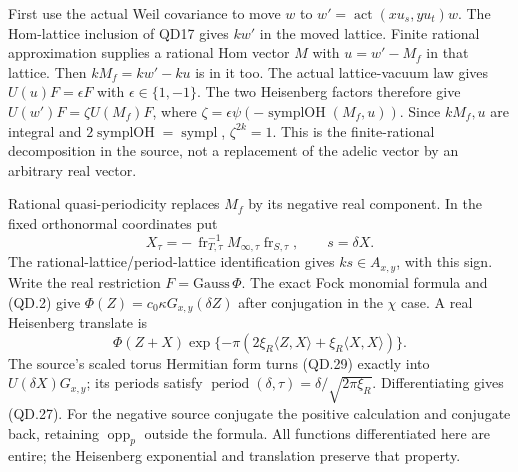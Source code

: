 First use the actual Weil covariance to move $w$ to
$w'=\operatorname{act}(xu_s,yu_t)w$.  The Hom-lattice inclusion
of QD17 gives $kw'$ in the moved lattice.  Finite rational
approximation supplies a rational Hom vector $M$ with
$u=w'-M_f$ in that lattice.  Then $kM_f=kw'-ku$ is in it too.
The actual lattice-vacuum law gives $U(u)F=\epsilon F$ with
$\epsilon\in\{1,-1\}$.  The two Heisenberg factors therefore
give
$U(w')F=\zeta U(M_f)F$, where
$\zeta=\epsilon\psi(-\operatorname{symplOH}(M_f,u))$.
Since $kM_f,u$ are integral and
$2\operatorname{symplOH}=\operatorname{sympl}$,
$\zeta^{2k}=1$.  This is the finite-rational decomposition in
the source, not a replacement of the adelic vector by an
arbitrary real vector.

Rational quasi-periodicity replaces $M_f$ by its negative real
component.  In the fixed orthonormal coordinates put
\[
 X_\tau=-\,\operatorname{fr}_{T,\tau}^{-1}M_{\infty,\tau}
                         \operatorname{fr}_{S,\tau},
                              \qquad s=\delta X.           \tag{QD.28}
\]
The rational-lattice/period-lattice identification gives
$ks\in A_{x,y}$, with this sign.  Write the real restriction
$F=\mathrm{Gauss}\,\Phi$.  The exact Fock monomial formula and
(QD.2) give $\Phi(Z)=c_0\kappa G_{x,y}(\delta Z)$ after
conjugation in the $\chi$ case.  A real Heisenberg translate
is
\[
 \Phi(Z+X)\exp\{-\pi(2\xi_R\langle Z,X\rangle
                                      +\xi_R\langle X,X\rangle)\}.
                                                               \tag{QD.29}
\]
The source's scaled torus Hermitian form turns (QD.29) exactly
into $U(\delta X)G_{x,y}$; its periods satisfy
$\operatorname{period}(\delta,\tau)
=\delta/\sqrt{2\pi\xi_R}$.  Differentiating gives (QD.27).
For the negative source conjugate the positive calculation and
conjugate back, retaining $\operatorname{opp}_p$ outside the
formula.  All functions differentiated here are entire; the
Heisenberg exponential and translation preserve that property.

